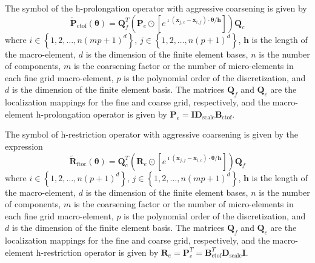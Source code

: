\documentclass[review]{siamart190516}
\begin{document}
\begin{definition}\label{def:h_prolongation_symbol}
The symbol of the h-prolongation operator with aggressive coarsening is given by
\begin{equation}
\tilde{\mathbf{P}}_{\text{ctof}} \left( \boldsymbol{\theta} \right) = \mathbf{Q}_f^T \left( \mathbf{P}_e \odot \left[ e^{\imath \left( \mathbf{x}_{j, c} - \mathbf{x}_{i, f} \right) \cdot \mathbf{\theta} / \mathbf{h}} \right] \right) \mathbf{Q}_c
\end{equation}
where $i \in \left\lbrace 1, 2, \dots, n \left( m p + 1 \right)^d \right\rbrace$, $j \in \left\lbrace 1, 2, \dots, n \left( p + 1 \right)^d \right\rbrace$, $\mathbf{h}$ is the length of the macro-element, $d$ is the dimension of the finite element bases, $n$ is the number of components, $m$ is the coarsening factor or the number of micro-elements in each fine grid macro-element, $p$ is the polynomial order of the discretization, and $d$ is the dimension of the finite element basis.
The matrices $\mathbf{Q}_f$ and $\mathbf{Q}_c$ are the localization mappings for the fine and coarse grid, respectively, and the macro-element h-prolongation operator is given by $\mathbf{P}_e = \mathbf{I} \mathbf{D}_{\text{scale}} \mathbf{B}_{\text{ctof}}$.
\end{definition}

\begin{definition}\label{def:h_restriction_symbol}
The symbol of h-restriction operator with aggressive coarsening is given by the expression
\begin{equation}
\tilde{\mathbf{R}}_{\text{ftoc}} \left( \boldsymbol{\theta} \right) = \mathbf{Q}_c^T \left( \mathbf{R}_e \odot \left[ e^{\imath \left( \mathbf{x}_{j, f} - \mathbf{x}_{i, c} \right) \cdot \boldsymbol{\theta} / \mathbf{h}} \right] \right) \mathbf{Q}_f
\end{equation}
where $i \in \left\lbrace 1, 2, \dots, n \left( p + 1 \right)^d \right\rbrace$, $j \in \left\lbrace 1, 2, \dots, n \left( m p + 1 \right)^d \right\rbrace$, $\mathbf{h}$ is the length of the macro-element, $d$ is the dimension of the finite element bases, $n$ is the number of components, $m$ is the coarsening factor or  the number of micro-elements in each fine grid macro-element, $p$ is the polynomial order of the discretization, and $d$ is the dimension of the finite element basis.
The matrices $\mathbf{Q}_f$ and $\mathbf{Q}_c$ are the localization mappings for the fine and coarse grid, respectively, and the macro-element h-restriction operator is given by $\mathbf{R}_e = \mathbf{P}_e^T = \mathbf{B}_{\text{ctof}}^T \mathbf{D}_{\text{scale}} \mathbf{I}$.
\end{definition}
\end{document}
